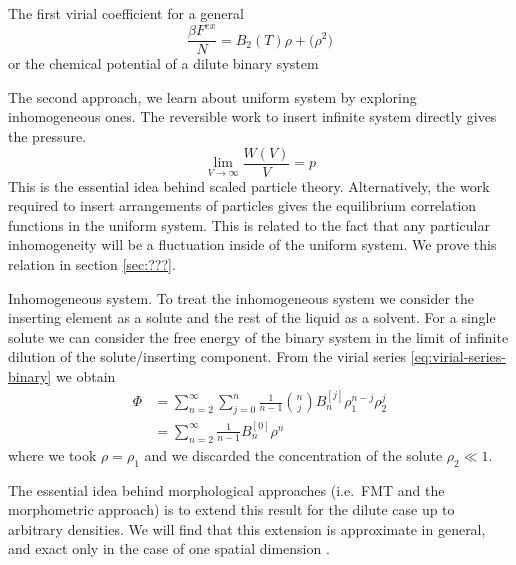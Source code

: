 \documentclass[12pt]{report}
\begin{document}
The first virial coefficient for a general
\begin{equation}
  \frac{\beta F^{ex}}{N} =
  B_2(T) \rho + \mathcal(\rho^2)
\end{equation}
or the chemical potential of a dilute binary system

The second approach, we learn about uniform system by exploring inhomogeneous ones.
The reversible work to insert infinite system directly gives the pressure.
\begin{equation}
  \lim_{V \to \infty} \frac{W(V)}{V} = p
\end{equation}
This is the essential idea behind scaled particle theory.
Alternatively, the work required to insert arrangements of particles gives the equilibrium correlation functions in the uniform system.
This is related to the fact that any particular inhomogeneity will be a fluctuation inside of the uniform system.
We prove this relation in section \ref{sec:???}.

Inhomogeneous system.
To treat the inhomogeneous system we consider the inserting element as a solute and the rest of the liquid as a solvent.
For a single solute we can consider the free energy of the binary system in the limit of infinite dilution of the solute/inserting component.
From the virial series \eqref{eq:virial-series-binary} we obtain
\begin{equation}
  \begin{aligned}
    \Phi &=
    \sum_{n=2}^\infty \sum_{j=0}^{n}
    \frac{1}{n-1} {n \choose j} B_n^{[j]} \rho_1^{n-j} \rho_2^j \\
    &=
    \sum_{n=2}^\infty
    \frac{1}{n-1} B_n^{[0]} \rho^n
  \end{aligned}
\end{equation}
where we took $\rho = \rho_1$ and we discarded the concentration of the solute $\rho_2 \ll 1$.

The essential idea behind morphological approaches (i.e.\ FMT and the morphometric approach) is to extend this result for the dilute case up to arbitrary densities.
We will find that this extension is approximate in general, and exact only in the case of one spatial dimension%
.
\end{document}
